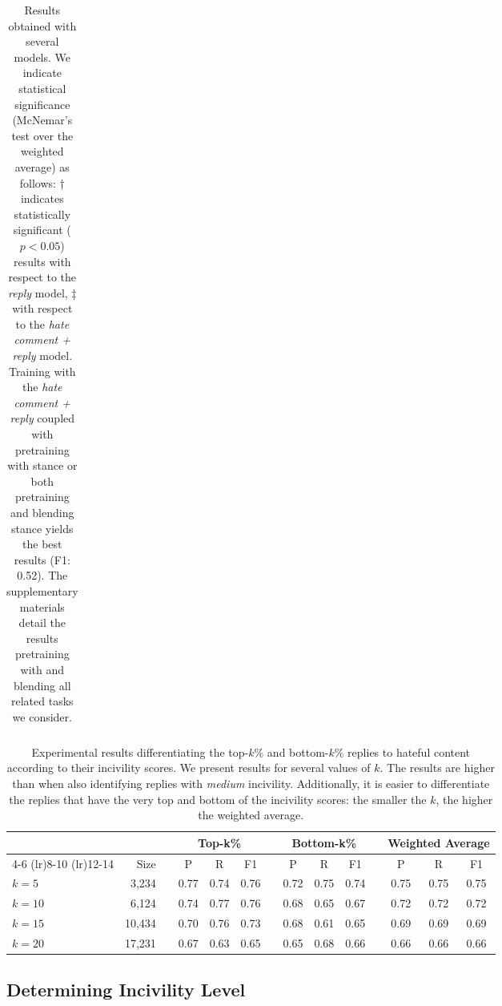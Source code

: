 \documentclass[11pt]{article}
\begin{document}
\begin{table*}[ht!]
\begin{tabular}{l ccc ccc ccc ccc}
		\end{tabular}
		\caption{Results obtained with several models. 
			We indicate statistical significance (McNemar’s test \cite{mcnemar1947note} over the weighted average) as follows: 
			† indicates statistically significant ($p<0.05$) results with respect to the \emph{reply} model, ‡ with respect to the \emph{hate comment + reply} model.
			Training with the \emph{hate comment + reply}
			coupled with pretraining with stance or both pretraining and blending stance yields the best results (F1: 0.52).
			The supplementary materials detail the results pretraining with and blending all related tasks we consider.}
		\label{t:model-results}
	\end{table*}
	
	\begin{table*}
		\small
		\centering	
		\begin{tabular}{lrl  cccc cccc ccc}
			\toprule
			\multicolumn{3}{c}{} & \multicolumn{3}{c}{Top-k\%} && \multicolumn{3}{c}{Bottom-k\%} && \multicolumn{3}{c}{Weighted Average}  \\ \cmidrule(lr){4-6} \cmidrule(lr){8-10} \cmidrule(lr){12-14} 
			& Size && P & R & F1 && P & R & F1 && P & R & F1  \\ \midrule
			$\mathit{k}=5$  &  3,234 &&0.77 & 0.74 & 0.76 && 0.72 & 0.75 & 0.74	&& 0.75 & 0.75 & 0.75 \\
			$\mathit{k}=10$ &  6,124 && 0.74 & 0.77 & 0.76 && 0.68 & 0.65 & 0.67 && 0.72 & 0.72 & 0.72 \\
			$\mathit{k}=15$ & 10,434 && 0.70 & 0.76 & 0.73 && 0.68 & 0.61 & 0.65 && 0.69 & 0.69 & 0.69 \\
			$\mathit{k}=20$ & 17,231 && 0.67 & 0.63 & 0.65 && 0.65 & 0.68 & 0.66  && 0.66 & 0.66 & 0.66 \\ \bottomrule
			
		\end{tabular}
		\caption{Experimental results differentiating the top-$k$\% and bottom-$k$\% replies to hateful content according to their incivility scores.
			We present results for several values of $k$.
			The results are higher than when also identifying replies with \emph{medium} incivility.
			Additionally, it is easier to differentiate the replies that have the very top and bottom of the incivility scores: the smaller the $k$, the higher the weighted average.
		}
		\label{t:model-optimalk}
	\end{table*}
	
	\subsection{Determining Incivility Level}
	\label{ss:levels}
	
\end{document}
